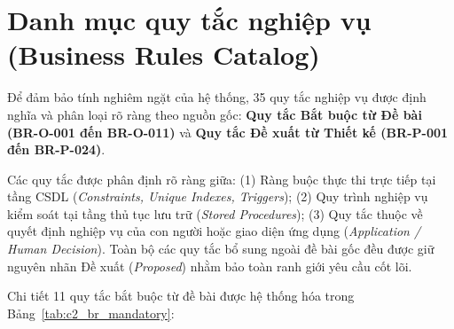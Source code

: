 \section{Danh mục quy tắc nghiệp vụ (Business Rules Catalog)}
\label{s:c2_br}

Để đảm bảo tính nghiêm ngặt của hệ thống, 35 quy tắc nghiệp vụ được định nghĩa và phân loại rõ ràng theo nguồn gốc: \textbf{Quy tắc Bắt buộc từ Đề bài (BR-O-001 đến BR-O-011)} và \textbf{Quy tắc Đề xuất từ Thiết kế (BR-P-001 đến BR-P-024)}.

Các quy tắc được phân định rõ ràng giữa:
(1) Ràng buộc thực thi trực tiếp tại tầng CSDL (\textit{Constraints, Unique Indexes, Triggers});
(2) Quy trình nghiệp vụ kiểm soát tại tầng thủ tục lưu trữ (\textit{Stored Procedures});
(3) Quy tắc thuộc về quyết định nghiệp vụ của con người hoặc giao diện ứng dụng (\textit{Application / Human Decision}). Toàn bộ các quy tắc bổ sung ngoài đề bài gốc đều được giữ nguyên nhãn Đề xuất (\textit{Proposed}) nhằm bảo toàn ranh giới yêu cầu cốt lõi.

Chi tiết 11 quy tắc bắt buộc từ đề bài được hệ thống hóa trong Bảng~\ref{tab:c2_br_mandatory}:


